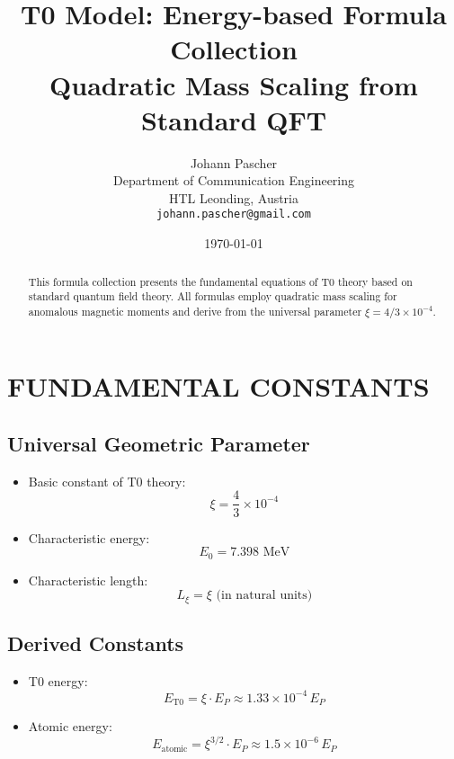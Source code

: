 \documentclass[12pt,a4paper]{article}
\begin{document}
	
	\title{T0 Model: Energy-based Formula Collection \\
		\large Quadratic Mass Scaling from Standard QFT}
	\author{Johann Pascher\\
		Department of Communication Engineering\\
		HTL Leonding, Austria\\
		\texttt{johann.pascher@gmail.com}}
	\date{\today}
	
	\maketitle
	
	\begin{abstract}
		This formula collection presents the fundamental equations of T0 theory based on standard quantum field theory. All formulas employ quadratic mass scaling for anomalous magnetic moments and derive from the universal parameter $\xi = 4/3 \times 10^{-4}$.
	\end{abstract}
	
	\tableofcontents
	\newpage
	
	\section{FUNDAMENTAL CONSTANTS}
	
	\subsection{Universal Geometric Parameter}
	\begin{itemize}
		\item Basic constant of T0 theory:
		$$\boxed{\xi = \frac{4}{3} \times 10^{-4}}$$
		
		\item Characteristic energy:
		$$E_0 = 7.398 \text{ MeV}$$
		
		\item Characteristic length:
		$$L_\xi = \xi \text{ (in natural units)}$$
	\end{itemize}
	
	\subsection{Derived Constants}
	\begin{itemize}
		\item T0 energy:
		$$E_{\text{T0}} = \xi \cdot E_P \approx 1.33 \times 10^{-4} \, E_P$$
		
		\item Atomic energy:
		$$E_{\text{atomic}} = \xi^{3/2} \cdot E_P \approx 1.5 \times 10^{-6} \, E_P$$
	\end{itemize}
	
\end{document}
